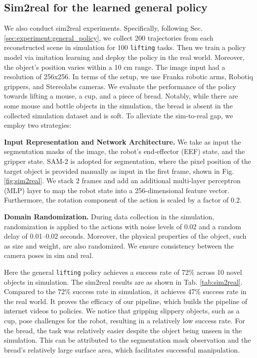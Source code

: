 \subsection{Sim2real for the learned general policy}
\label{sec:experiment:sim2real}

We also conduct sim2real experiments. Specifically, following Sec. \ref{sec:experiment:general_policy}, we collect 200 trajectories from each reconstructed scene in simulation for 100 \texttt{lifting} tasks. Then we train a policy model via imitation learning and deploy the policy in the real world.
Moreover, the object's position varies within a 10 cm range. The image input had a resolution of 256x256. In terms of the setup, we use Franka robotic arms, Robotiq grippers, and Stereolabs cameras. We evaluate the performance of the policy towards lifting a mouse, a cup, and a piece of bread. Notably, while there are some mouse and bottle objects in the simulation, the bread is absent in the collected simulation dataset and is soft.
To alleviate the sim-to-real gap, we employ two strategies:

\textbf{Input Representation and Network Architecture. }
We take as input the segmentation masks of the image, the robot’s end-effector (EEF) state, and the gripper state. SAM-2 is adopted for segmentation, where the pixel position of the target object is provided manually as input in the first frame, shown in Fig. \ref{fig:sim2real}. We stack 2 frames and add an additional multi-layer perceptron (MLP) layer to map the robot state into a 256-dimensional feature vector. Furthermore, the rotation component of the action is scaled by a factor of 0.2.

\textbf{Domain Randomization. }
During data collection in the simulation, randomization is applied to the actions with noise levels of 0.02 and a random delay of 0.01–0.02 seconds. Moreover, the physical properties of the object, such as size and weight, are also randomized. We ensure consistency between the camera poses in sim and real.

Here the general \texttt{lifting} policy achieves a success rate of 72\% across 10 novel objects in simulation.
The sim2real results are as shown in Tab. \ref{tab:sim2real}. Compared to the 72\% success rate in simulation, it achieves 47\% success rate in the real world. It proves the efficacy of our pipeline, which builds the pipeline of internet videos to policies.
We notice that gripping slippery objects, such as a cup, pose challenges for the robot, resulting in a relatively low success rate. For the bread, the task was relatively easier despite the object being unseen in the simulation. This can be attributed to the segmentation mask observation and the bread's relatively large surface area, which facilitates successful manipulation.

